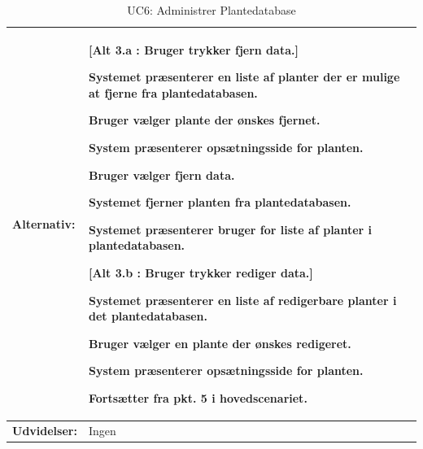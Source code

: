 \begin{table}[h]
\begin{tabularx}{\textwidth}{| >{\raggedright\arraybackslash}p{3.3 cm} | >{\raggedright\arraybackslash}X |}
\textbf{Alternativ:}				& 
\textbf{{[}Alt 3.a : Bruger trykker fjern data.{]}}
\begin{packed_enum}
\setcounter{enumi}{3}
\item Systemet præsenterer en liste af planter der er mulige at fjerne fra plantedatabasen.
\item Bruger vælger plante der ønskes fjernet.
\item System præsenterer opsætningsside for planten.
\item Bruger vælger fjern data.
\item Systemet fjerner planten fra plantedatabasen.
\item Systemet præsenterer bruger for liste af planter i plantedatabasen.
\end{packed_enum}
\textbf{{[}Alt 3.b : Bruger trykker rediger data.{]}}
\begin{packed_enum}
\setcounter{enumi}{3}
\item Systemet præsenterer en liste af redigerbare planter i det plantedatabasen.
\item Bruger vælger en plante der ønskes redigeret.
\item System præsenterer opsætningsside for planten.
\item Fortsætter fra pkt. 5 i hovedscenariet.
\end{packed_enum}
\\ \hline

\textbf{Udvidelser:}				&  
Ingen
\\ \hline
\end{tabularx}
\caption{UC6: Administrer Plantedatabase}
\label{tbl:UC6}
\end{table}

\clearpage


